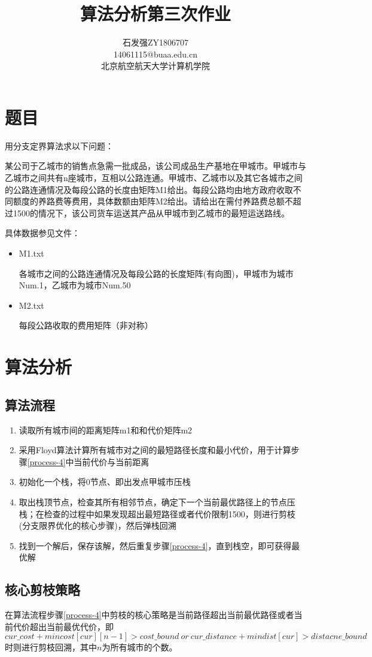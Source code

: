 \documentclass[a4paper,12pt]{article}
\title{\bf 算法分析第三次作业}
\author{石发强\quad ZY1806707 \\
14061115@buaa.edu.cn \\
北京航空航天大学\quad 计算机学院}
\begin{document}
\maketitle
\section{题目}
用分支定界算法求以下问题：

某公司于乙城市的销售点急需一批成品，该公司成品生产基地在甲城市。甲城市与乙城市之间共有n座城市，互相以公路连通。甲城市、乙城市以及其它各城市之间的公路连通情况及每段公路的长度由矩阵M1给出。每段公路均由地方政府收取不同额度的养路费等费用，具体数额由矩阵M2给出。请给出在需付养路费总额不超过1500的情况下，该公司货车运送其产品从甲城市到乙城市的最短运送路线。

具体数据参见文件：
\begin{itemize}
    \item M1.txt
        
        各城市之间的公路连通情况及每段公路的长度矩阵(有向图)，甲城市为城市Num.1，乙城市为城市Num.50
    \item M2.txt
        
        每段公路收取的费用矩阵（非对称）
\end{itemize}
\section{算法分析}
\subsection{算法流程}
\begin{enumerate}
    \item 读取所有城市间的距离矩阵m1和和代价矩阵m2
    \item 采用Floyd算法计算所有城市对之间的最短路径长度和最小代价，用于计算步骤\ref{process-4}中当前代价与当前距离
    \item 初始化一个栈，将0节点、即出发点甲城市压栈
    \item 取出栈顶节点，检查其所有相邻节点，确定下一个当前最优路径上的节点压栈；在检查的过程中如果发现超出最短路径或者代价限制1500，则进行剪枝(分支限界优化的核心步骤)，然后弹栈回溯 \label{process-4}
    \item 找到一个解后，保存该解，然后重复步骤\ref{process-4}，直到栈空，即可获得最优解
\end{enumerate}
\subsection{核心剪枝策略}
在算法流程步骤\ref{process-4}中剪枝的核心策略是当前路径超出当前最优路径或者当前代价超出当前最优代价，即
$$cur\_cost+mincost[cur][n-1] > cost\_bound\  or\  cur\_distance+mindist[cur] > distacne\_bound$$ 时则进行剪枝回溯，其中$n$为所有城市的个数。
\end{document}
